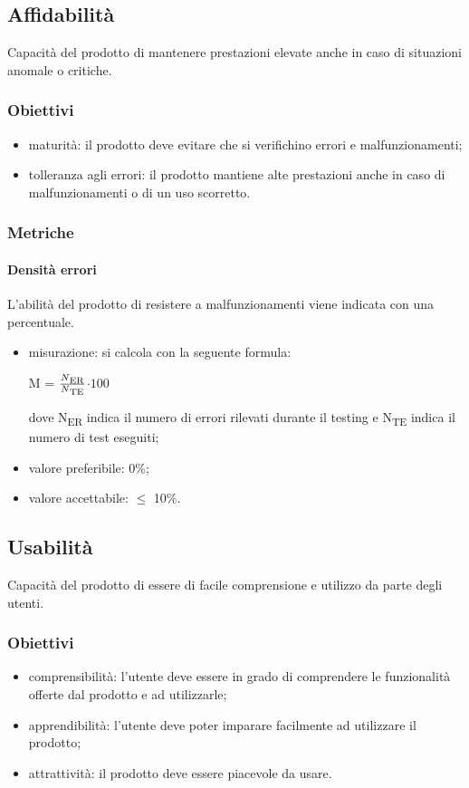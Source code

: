 	\subsection{Affidabilità}
	Capacità del prodotto di mantenere prestazioni elevate anche in caso di situazioni anomale o critiche.
		\subsubsection{Obiettivi}
		\begin{itemize}
			\item maturità: il prodotto deve evitare che si verifichino errori e malfunzionamenti;
			\item tolleranza agli errori: il prodotto mantiene alte prestazioni anche in caso di malfunzionamenti o di un uso scorretto.
		\end{itemize}
		\subsubsection{Metriche}
			\paragraph{Densità errori}
			L'abilità del prodotto di resistere a malfunzionamenti viene indicata con una percentuale.
			\begin{itemize}
			\item misurazione: si calcola con la seguente formula: \\
			\centerline{ M =  \(\frac{N\textsubscript{ER}}{N\textsubscript{TE}} \)$ \cdot 100$ }
			dove N\textsubscript{ER} indica il numero di errori rilevati durante il testing e N\textsubscript{TE} indica il numero di test eseguiti;
			\item valore preferibile: 0\%;
			\item valore accettabile: $\leq$ 10\%.
			\end{itemize}
	\subsection{Usabilità}
	Capacità del prodotto di essere di facile comprensione e utilizzo da parte degli utenti.
		\subsubsection{Obiettivi}
		\begin{itemize}
			\item comprensibilità: l'utente deve essere in grado di comprendere le funzionalità offerte dal prodotto e ad utilizzarle;
			\item apprendibilità: l'utente deve poter imparare facilmente ad utilizzare il prodotto;
			\item attrattività: il prodotto deve essere piacevole da usare.
		\end{itemize}
